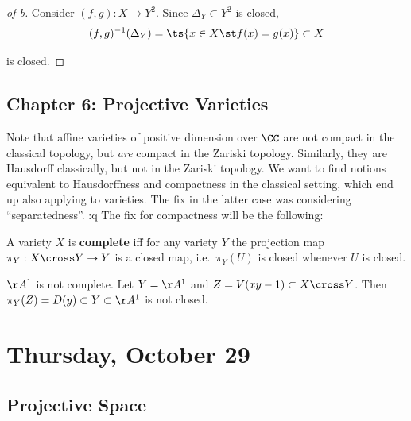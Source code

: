 \begin{proof}[of b]

Consider \((f, g): X\to Y^2\). Since \(\Delta_Y \subset Y^2\) is closed,
\begin{align*}
(f, g)^{-1}(\Delta_Y) = \ts{x\in X \st f(x) = g(x)} \subset X
\end{align*}

is closed.

\end{proof}

\hypertarget{chapter-6-projective-varieties}{%
\subsection{Chapter 6: Projective
Varieties}\label{chapter-6-projective-varieties}}

Note that affine varieties of positive dimension over \(\CC\) are not
compact in the classical topology, but \emph{are} compact in the Zariski
topology. Similarly, they are Hausdorff classically, but not in the
Zariski topology. We want to find notions equivalent to Hausdorffness
and compactness in the classical setting, which end up also applying to
varieties. The fix in the latter case was considering ``separatedness''.
:q The fix for compactness will be the following:

\begin{definition}[Complete]

A variety \(X\) is \textbf{complete} iff for any variety \(Y\) the
projection map \(\pi_Y:X\cross Y\to Y\) is a closed map,
i.e.~\(\pi_Y(U)\) is closed whenever \(U\) is closed.

\end{definition}

\begin{example}

\(\AA^1\) is not complete. Let \(Y=\AA^1\) and
\(Z = V(xy-1)\subset X\cross Y\). Then
\(\pi_Y(Z) = D(y) \subset Y \subset \AA^1\) is not closed.

\end{example}

\hypertarget{thursday-october-29}{%
\section{Thursday, October 29}\label{thursday-october-29}}

\hypertarget{projective-space}{%
\subsection{Projective Space}\label{projective-space}}

